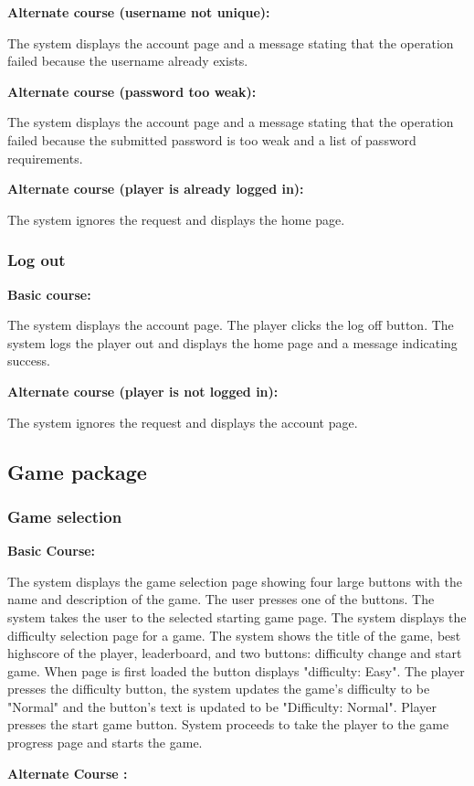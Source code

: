 \documentclass[11pt,a4paper]{article}
\newcommand{\heading}[1]{\vspace{1em}\noindent\textbf{#1}\par\vspace{0.5em}}
\begin{document}
\heading{Alternate course (username not unique):}
The system displays the account page and a message stating that the operation failed because the username already exists.

\heading{Alternate course (password too weak):}
The system displays the account page and a message stating that the operation failed because the submitted password is too weak and a list of password requirements.

\heading{Alternate course (player is already logged in):}
The system ignores the request and displays the home page.

\subsubsection{Log out}

\heading{Basic course:}
The system displays the account page. The player clicks the log off button. The system logs the player out and displays the home page and a message indicating success.

\heading{Alternate course (player is not logged in):}
The system ignores the request and displays the account page.

\subsection{Game package}

\subsubsection{Game selection}

\heading{Basic Course:}
The system displays the game selection page showing four large buttons with the name and description of the game. The user presses one of the buttons. The system takes the user to the selected starting game page. The system displays the difficulty selection page for a game. The system shows the title of the game, best highscore of the player, leaderboard, and two buttons: difficulty change and start game. When page is first loaded the button displays "difficulty: Easy". The player presses the difficulty button, the system updates the game's difficulty to be "Normal" and the button's text is updated to be "Difficulty: Normal". Player presses the start game button. System proceeds to take the player to the game progress page and starts the game.    


\heading{Alternate Course :}
\end{document}
